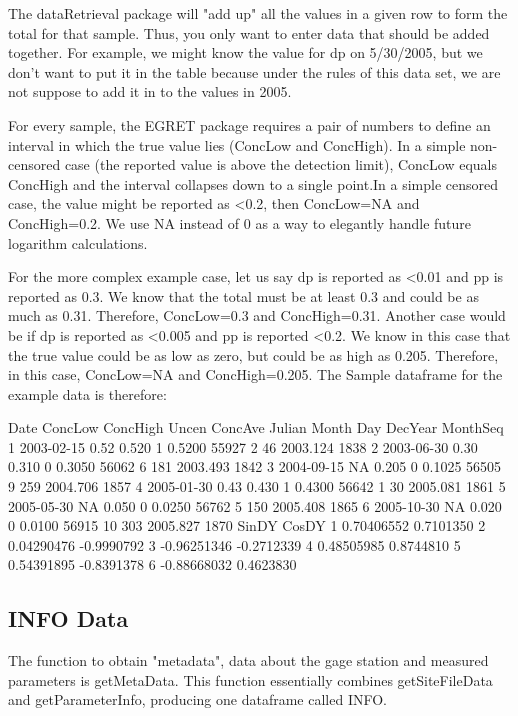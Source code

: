\documentclass[a4paper,11pt]{article}
\begin{document}
The dataRetrieval package will "add up" all the values in a given row to form the total for that sample. Thus, you only want to enter data that should be added together. For example, we might know the value for dp on 5/30/2005, but we don't want to put it in the table because under the rules of this data set, we are not suppose to add it in to the values in 2005.

For every sample, the EGRET package requires a pair of numbers to define an interval in which the true value lies (ConcLow and ConcHigh). In a simple non-censored case (the reported value is above the detection limit), ConcLow equals ConcHigh and the interval collapses down to a single point.In a simple censored case, the value might be reported as <0.2, then ConcLow=NA and ConcHigh=0.2. We use NA instead of 0 as a way to elegantly handle future logarithm calculations.

For the more complex example case, let us say dp is reported as <0.01 and pp is reported as 0.3. We know that the total must be at least 0.3 and could be as much as 0.31. Therefore, ConcLow=0.3 and ConcHigh=0.31. Another case would be if dp is reported as <0.005 and pp is reported <0.2. We know in this case that the true value could be as low as zero, but could be as high as 0.205. Therefore, in this case, ConcLow=NA and ConcHigh=0.205. The Sample dataframe for the example data is therefore:

\begin{Schunk}
\begin{Soutput}
        Date ConcLow ConcHigh Uncen ConcAve Julian Month Day  DecYear MonthSeq
1 2003-02-15    0.52    0.520     1  0.5200  55927     2  46 2003.124     1838
2 2003-06-30    0.30    0.310     0  0.3050  56062     6 181 2003.493     1842
3 2004-09-15      NA    0.205     0  0.1025  56505     9 259 2004.706     1857
4 2005-01-30    0.43    0.430     1  0.4300  56642     1  30 2005.081     1861
5 2005-05-30      NA    0.050     0  0.0250  56762     5 150 2005.408     1865
6 2005-10-30      NA    0.020     0  0.0100  56915    10 303 2005.827     1870
        SinDY      CosDY
1  0.70406552  0.7101350
2  0.04290476 -0.9990792
3 -0.96251346 -0.2712339
4  0.48505985  0.8744810
5  0.54391895 -0.8391378
6 -0.88668032  0.4623830
\end{Soutput}
\end{Schunk}



\subsection{INFO Data}
The function to obtain "metadata", data about the gage station and measured parameters is getMetaData. This function essentially combines getSiteFileData and getParameterInfo, producing one dataframe called INFO.
\end{document}
